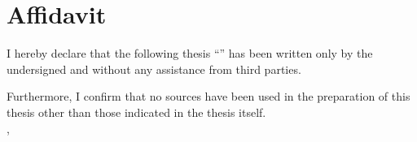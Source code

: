 \vspace*{100mm}
\begin{minipage}{109.5mm}
\section*{Affidavit}
I hereby declare that the following thesis ``\metaTitle'' has been
written only by the undersigned and without any assistance from third
parties.

Furthermore, I confirm that no sources have been used in the preparation
of this thesis other than those indicated in the thesis itself.\\[2cm]
\metaCity,
\metaDate%
\end{minipage}
